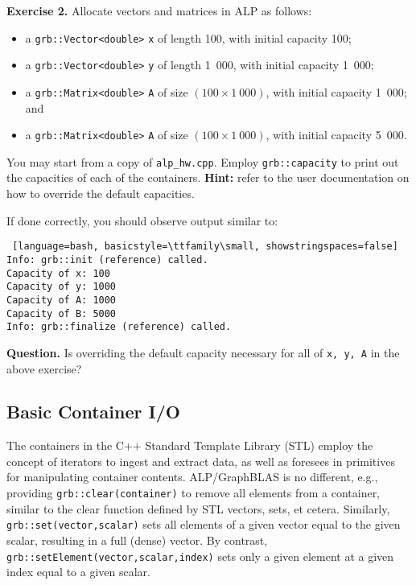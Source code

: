 \noindent \textbf{Exercise 2.} Allocate vectors and matrices in ALP as follows:
\begin{itemize}
  \item a \texttt{grb::Vector<double>} \texttt{x} of length 100, with initial capacity 100;
  \item a \texttt{grb::Vector<double>} \texttt{y} of length 1\ 000, with initial capacity 1\ 000;
  \item a \texttt{grb::Matrix<double>} \texttt{A} of size $(100 \times 1\ 000)$, with initial capacity 1\ 000; and
  \item a \texttt{grb::Matrix<double>} \texttt{A} of size $(100 \times 1\ 000)$, with initial capacity 5\ 000.
\end{itemize}
You may start from a copy of \texttt{alp\_hw.cpp}. Employ \texttt{grb::capacity} to print out the capacities of each of the containers. \textbf{Hint:} refer to the user documentation on how to override the default capacities.

If done correctly, you should observe output similar to:

\begin{lstlisting} [language=bash, basicstyle=\ttfamily\small, showstringspaces=false]
Info: grb::init (reference) called.
Capacity of x: 100
Capacity of y: 1000
Capacity of A: 1000
Capacity of B: 5000
Info: grb::finalize (reference) called.
\end{lstlisting}

\noindent \textbf{Question.} Is overriding the default capacity necessary for all of \texttt{x, y, A} in the above exercise?

\subsection{Basic Container I/O}

The containers in the C++ Standard Template Library (STL) employ the concept of iterators to ingest and extract data, as well as foresees in primitives for manipulating container contents.
ALP/GraphBLAS is no different, e.g., providing \texttt{grb::clear(container)} to remove all elements from a container, similar to the clear function defined by STL vectors, sets, et cetera.
Similarly, \texttt{grb::set(vector,scalar)} sets all elements of a given vector equal to the given scalar, resulting in a full (dense) vector.
By contrast, \texttt{grb::setElement(vector,scalar,index)} sets only a given element at a given index equal to a given scalar.

